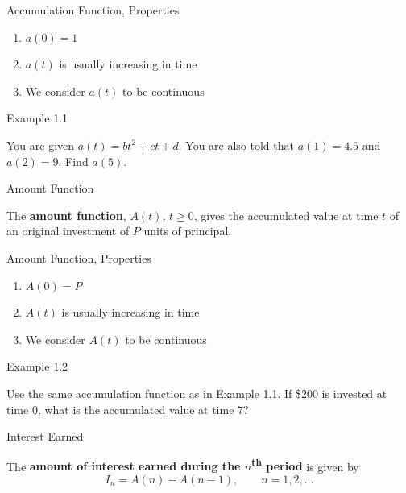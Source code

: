 \documentclass{beamer}
\begin{document}
\begin{frame}{Accumulation Function, Properties}

\begin{enumerate}
\item $a(0) = 1$
\bigskip
\item $a(t)$ is usually increasing in time
\bigskip
\item We consider $a(t)$ to be continuous
\end{enumerate}

\end{frame}

\begin{frame}{Example 1.1}

You are given $a(t) = bt^2 + ct + d$. You are also told that $a(1) = 4.5$ and $a(2) = 9$. Find $a(5)$.

\vfill
\end{frame}

\begin{frame}{Amount Function}

\begin{defn}
The \textbf{amount function}, $A(t)$, $t \ge 0$, gives the accumulated value at time $t$ of an original investment of $P$ units of principal.
\end{defn}

\end{frame}

\begin{frame}{Amount Function, Properties}

\begin{enumerate}
\item $A(0) = P$
\bigskip
\item $A(t)$ is usually increasing in time
\bigskip
\item We consider $A(t)$ to be continuous
\end{enumerate}

\end{frame}

\begin{frame}{Example 1.2}

Use the same accumulation function as in Example 1.1. If \$200 is invested at time 0, what is the accumulated value at time 7?

\vfill
\end{frame}

\begin{frame}{Interest Earned}

The \textbf{amount of interest earned during the $n$\textsuperscript{th} period} is given by
\[
I_n = A(n) - A(n-1), \qquad n = 1, 2, \ldots
\]

\end{frame}
\end{document}
